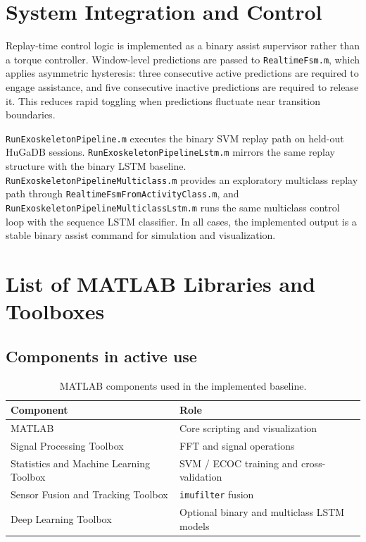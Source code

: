 \section{System Integration and Control}
Replay-time control logic is implemented as a binary assist supervisor rather than a torque controller. Window-level predictions are passed to \texttt{RealtimeFsm.m}, which applies asymmetric hysteresis: three consecutive active predictions are required to engage assistance, and five consecutive inactive predictions are required to release it. This reduces rapid toggling when predictions fluctuate near transition boundaries.

\texttt{RunExoskeletonPipeline.m} executes the binary SVM replay path on held-out HuGaDB sessions. \texttt{RunExoskeletonPipelineLstm.m} mirrors the same replay structure with the binary LSTM baseline. \texttt{RunExoskeletonPipelineMulticlass.m} provides an exploratory multiclass replay path through \texttt{RealtimeFsmFromActivityClass.m}, and \texttt{RunExoskeletonPipelineMulticlassLstm.m} runs the same multiclass control loop with the sequence LSTM classifier. In all cases, the implemented output is a stable binary assist command for simulation and visualization.

\section{List of MATLAB Libraries and Toolboxes}
\subsection*{Components in active use}
\begin{table}[htbp]
  \centering
  \caption{MATLAB components used in the implemented baseline.}
  \begin{tabular}{@{}ll@{}}
    \toprule
    \textbf{Component} & \textbf{Role} \\
    \midrule
    MATLAB & Core scripting and visualization \\
    Signal Processing Toolbox & FFT and signal operations \\
    Statistics and Machine Learning Toolbox & SVM / ECOC training and cross-validation \\
    Sensor Fusion and Tracking Toolbox & \texttt{imufilter} fusion \\
    Deep Learning Toolbox & Optional binary and multiclass LSTM models \\
    \bottomrule
  \end{tabular}
\end{table}
